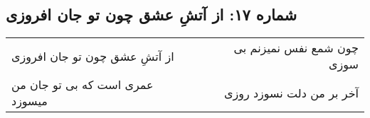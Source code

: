 \begin{center}
\section*{شماره ۱۷: از آتشِ عشق چون تو جان افروزی}
\label{sec:017}
\begin{longtable}{l p{0.5cm} r}
از آتشِ عشق چون تو جان افروزی
&&
چون شمع نفس نمیزنم بی سوزی
\\
عمری است که بی تو جان من میسوزد
&&
آخر بر من دلت نسوزد روزی
\\
\end{longtable}
\end{center}
